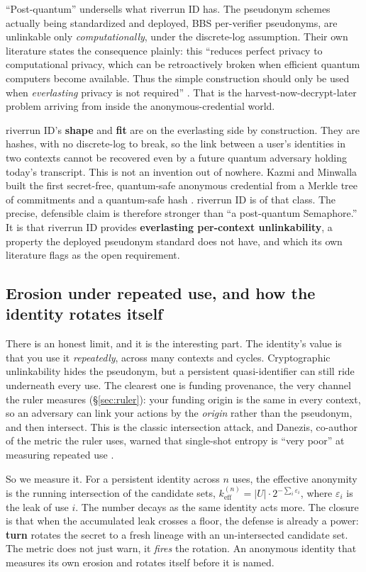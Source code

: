 \documentclass[11pt]{article}
\begin{document}
``Post-quantum'' undersells what riverrun ID has. The pseudonym schemes actually being
standardized and deployed, BBS per-verifier pseudonyms, are unlinkable only
\emph{computationally}, under the discrete-log assumption. Their own literature states
the consequence plainly: this ``reduces perfect privacy to computational privacy, which
can be retroactively broken when efficient quantum computers become available. Thus the
simple construction should only be used when \emph{everlasting} privacy is not
required'' \cite{bbspseudo}. That is the harvest-now-decrypt-later problem arriving from
inside the anonymous-credential world.

riverrun ID's \textbf{shape} and \textbf{fit} are on the everlasting side by
construction. They are hashes, with no discrete-log to break, so the link between a
user's identities in two contexts cannot be recovered even by a future quantum
adversary holding today's transcript. This is not an invention out of nowhere. Kazmi
and Minwalla built the first secret-free, quantum-safe anonymous credential from a
Merkle tree of commitments and a quantum-safe hash \cite{kazmi}. riverrun ID is of that
class. The precise, defensible claim is therefore stronger than ``a post-quantum
Semaphore.'' It is that riverrun ID provides \textbf{everlasting per-context
unlinkability}, a property the deployed pseudonym standard does not have, and which its
own literature flags as the open requirement.

\subsection{Erosion under repeated use, and how the identity rotates itself}
\label{sub:erosion}

There is an honest limit, and it is the interesting part. The identity's value is that
you use it \emph{repeatedly}, across many contexts and cycles. Cryptographic
unlinkability hides the pseudonym, but a persistent quasi-identifier can still ride
underneath every use. The clearest one is funding provenance, the very channel the ruler
measures (\S\ref{sec:ruler}): your funding origin is the same in every context, so an
adversary can link your actions by the \emph{origin} rather than the pseudonym, and then
intersect. This is the classic intersection attack, and Danezis, co-author of the metric
the ruler uses, warned that single-shot entropy is ``very poor'' at measuring repeated
use \cite{danezismeasure}.

So we measure it. For a persistent identity across $n$ uses, the effective anonymity is
the running intersection of the candidate sets, $k_{\text{eff}}^{(n)} = |U| \cdot
2^{-\sum_i \varepsilon_i}$, where $\varepsilon_i$ is the leak of use $i$. The number
decays as the same identity acts more. The closure is that when the accumulated leak
crosses a floor, the defense is already a power: \textbf{turn} rotates the secret to a
fresh lineage with an un-intersected candidate set. The metric does not just warn, it
\emph{fires} the rotation. An anonymous identity that measures its own erosion and
rotates itself before it is named.
\end{document}
